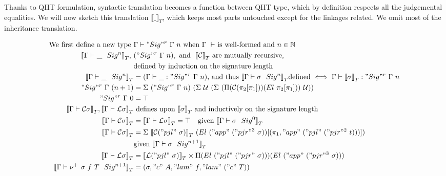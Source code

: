 \newcommand{\denotesT}[1]{{{\llbracket {#1} \rrbracket}_T}}
\newcommand{\Sigr}[2]{{ "Sig"^r~{#1}~{#2} }}

Thanks to QIIT formulation, syntactic translation becomes a function between QIIT type, which by definition respects all the judgemental equalities. We will now sketch this translation $\denotesT{\_}$, which keeps most parts untouched except for the linkages related. We omit most of the inheritance translation.



\begin{align*}
  \text{We first define a new type }& \goodType{\Gamma}{\Sigr{\Gamma}{n}}{}  \text{ when } \goodCtx{\Gamma}{}  \text{ is well-formed and } n \in \mathbb{N} \\
  \denotesT{\goodSig{\Gamma}{\_}{n}},\ &({\Sigr{\Gamma}{n}}), \text{ and } \ \denotesT{\cC} \text{ are mutually recursive, } \\
  & \text{defined by induction on the signature length} \\  
  \denotesT{\goodSig{\Gamma}{\_}{n}} &= (\goodTerm{\Gamma}{\_}{\Sigr{\Gamma}{n}}) \text{, and thus } \denotesT{\goodSig{\Gamma}{\sigma}{n}} \text{defined} \iff \goodTerm{\Gamma}{\denotesT{\sigma}}{\Sigr{\Gamma}{n}} \\ 
  {\Sigr{\Gamma}{(n+1)}} &= 
    \Sigma~(\Sigr{\Gamma}{n})
          ~(\Sigma~\cU
                  ~(\Sigma~(\Pi(\cC (\pi_2[\pi_1]))(El~\pi_2[\pi_1]))~\cU)) \\
  \Sigr{\Gamma}{0} &= \top \\
  \denotesT{\goodType{\Gamma}{\cC \sigma}{}}, \denotesT{\goodType{\Gamma}{\cL\sigma}{}} &\text{ defines upon } \denotesT{\sigma} 
  \text{ and inductively on the signature length} \\
  \denotesT{\goodType{\Gamma}{\cC \sigma}{}} &= \denotesT{\goodType{\Gamma}{\cL\sigma}{}} = \top \quad
      \text{given } \denotesT{\goodSig{\Gamma}{\sigma}{0}} \\ 
  \denotesT{\goodType{\Gamma}{\cC \sigma}{}} &= 
    \Sigma~\denotesT{\cC ("pjl"~\sigma)}~(El \ ("app"~("pjr"^3~\sigma))[(\pi_1, "app"~("pjl"~("pjr"^2~t)))]) \\
      &\text{given } \denotesT{\goodSig{\Gamma}{\sigma}{n+1}} \\
  \denotesT{\goodType{\Gamma}{\cL\sigma}{}} &=
  \denotesT{\cL("pjl"~\sigma)} \times \Pi(El~("pjl"~("pjr"~\sigma)))(El~("app"~("pjr"^3~\sigma))) \\
  \denotesT{\goodSig{\Gamma}{\nu^+~\sigma~f~T}{n+1}} &= (\sigma, "c"~A, "lam"~f, "lam"~("c"~T)) \\ 

\end{align*}
